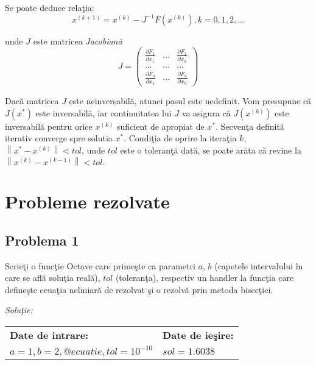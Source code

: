 \documentclass{exam}
\newcommand{\octavescript}[2]{
	
}
\begin{document}
Se poate deduce relaţia:
$$x^{(k+1)} = x^{(k)} - J^{-1}F(x^{(k)}), k=0,1,2,... $$

\noindent  unde $J$ este matricea \textit{Jacobiană}
\[J=  \left( \begin{array}{ccc}
			\frac{\partial F_{1}}{ \partial x_{1}} & ...   & \frac{\partial F_{1}}{ \partial x_{n}} \\
			{...}                                  & {...} & {...}                                  \\
			\frac{\partial F_{n}}{ \partial x_{1}} & ...   & \frac{\partial F_{n}}{ \partial x_{n}}
		\end{array} \right)\]

Dacă matricea $J$ este neinversabilă, atunci pasul este nedefinit. Vom presupune că $J(x^*)$ este inversabilă, iar continuitatea lui $J$ va asigura că $J(x^{(k)})$ este inversabilă pentru orice $x^{(k)}$ suficient de apropiat de $x^*$.
Secvenţa definită iterativ converge spre solutia $x^*$.
Condiţia de oprire la iteraţia $k$, $\left \|x^{*}-x^{(k)}  \right \|<tol$, unde $tol$ este o toleranţă dată, se poate arăta că revine la $\left \|x^{(k)}-x^{(k-1)}  \right \|<tol.$

\section{Probleme rezolvate}

\subsection{Problema 1}

Scrieţi o funcţie Octave care primeşte ca parametri $a$, $b$ (capetele intervalului în care se află soluţia reală), $tol$ (toleranţa), respectiv un handler la funcţia care defineşte ecuaţia neliniară de rezolvat şi o rezolvă prin metoda bisecţiei.

\textit{Soluţie:}

\octavescript{./src/bisect.m}{Metoda bisecţiei.}

\begin{center}
	\begin{tabular}{| l | l |}
		\hline
		\textbf{Date de intrare:}                  & \textbf{Date de ieşire:} \\
		$a = 1, b = 2, @ecuatie, tol = 10 ^ {-10}$ & $sol = 1.6038$           \\
		\hline
	\end{tabular}
\end{center}
\end{document}
